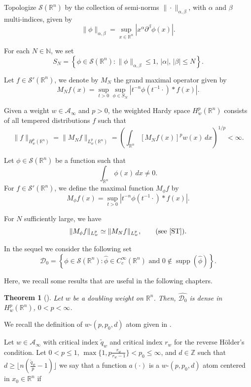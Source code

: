 \documentclass[a4paper,12pt,reqno]{amsart}
\numberwithin{equation}{section}
\newtheorem{theorem}{Theorem}[section]
\begin{document}
	Topologize $\mathcal{S}(\mathbb{R}^n)$ by the collection of semi-norms
	$\|\cdot\|_{\alpha,\beta}$, with $\alpha$ and $\beta$ multi-indices, given by
	\[
	\|\phi\|_{\alpha,\beta}
	=
	\sup_{x\in\mathbb{R}^n}
	\left|x^\alpha \partial^\beta \phi(x)\right|.
	\]
	
	For each $N\in\mathbb{N}$, we set
	\[
	S_N
	=
	\left\{
	\phi\in\mathcal{S}(\mathbb{R}^n):
	\|\phi\|_{\alpha,\beta}\le 1,\,
	|\alpha|,\,|\beta|\le N
	\right\}.
	\]
	
	Let $f\in\mathcal{S}'(\mathbb{R}^n)$, we denote by $M_N$ the grand maximal operator given by
	\[
	M_Nf(x)
	=
	\sup_{t>0}
	\sup_{\phi\in S_N}
	\left|
	t^{-n}\phi(t^{-1}\cdot)*f(x)
	\right|.
	\]
	
	Given a weight $w\in \mathcal{A}_\infty$ and $p>0$, the weighted Hardy space
	$H_w^p(\mathbb{R}^n)$ consists of all tempered distributions $f$ such that
	\[
	\|f\|_{H_w^p(\mathbb{R}^n)}
	=
	\|M_Nf\|_{L_w^p(\mathbb{R}^n)}
	=
	\left(
	\int_{\mathbb{R}^n}
	[M_Nf(x)]^p
	w(x)\,dx
	\right)^{1/p}
	<\infty.
	\]
	
	Let $\phi\in\mathcal{S}(\mathbb{R}^n)$ be a function such that
	\[
	\int_{\mathbb{R}^n}\phi(x)\,dx\neq 0.
	\]
	For $f\in\mathcal{S}'(\mathbb{R}^n)$, we define the maximal function
	$M_\phi f$ by
	\[
	M_\phi f(x)
	=
	\sup_{t>0}
	\left|
	t^{-n}\phi(t^{-1}\cdot)*f(x)
	\right|.
	\]
	
	For $N$ sufficiently large, we have
	\[
	\|M_\phi f\|_{L_w^p}
	\simeq
	\|M_Nf\|_{L_w^p},
	\qquad
	\text{(see \cite{ST}).}
	\]
	
	In the sequel we consider the following set
	\[
	\mathcal{D}_{0}
	=
	\left\{
	\phi\in\mathcal{S}(\mathbb{R}^n):
	\widehat{\phi}\in C_c^\infty(\mathbb{R}^n)
	\text{ and }
	0\notin\operatorname{supp}(\widehat{\phi})
	\right\}.
	\]
	
	Here, we recall some results that are useful in the following chapters.
	
	\begin{theorem}[\cite{ST}]
		Let $w$ be a doubling weight on $\mathbb{R}^{n}$. Then, $\hat{\mathcal{D}_0}$ is dense in $H^{p}_w(\mathbb{R}^{n})$, $0<p<\infty$.
	\end{theorem}
	
	We recall the definition of $w$-$(p,p_0,d)$ atom given in \cite{Rocha}.
	
	Let $w \in \mathcal{A}_{\infty}$ with critical index $\tilde{q}_w$ and critical index $r_w$ for the reverse H\"{o}lder's condition. Let $0<p\leq 1$, $\max\{1,p\frac{r_w}{r_w-1}\} <p_0 \leq \infty$, and $d \in \mathbb{Z}$ such that $d \geq \lfloor n ( \frac{\tilde{q}_w}{p}-1)\rfloor $ we say that a function $a(\cdot)$ is a $w$-$(p,p_0,d)$ atom centered in $x_0 \in \mathbb{R}^{n}$ if
	
\end{document}

